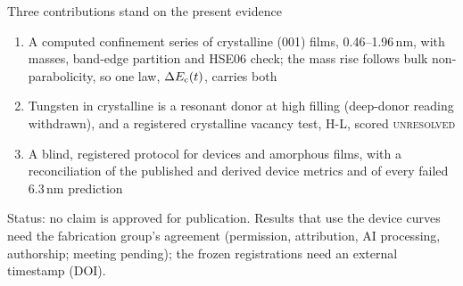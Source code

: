 \begin{frame}{Three contributions stand on the present evidence}
  \fourteenTop
  \begin{enumerate}\small
    \setlength{\itemsep}{2.5mm}
    \item A computed confinement series of crystalline (001) \InO{} films, 0.46--1.96\,nm, with masses, band-edge
      partition and HSE06 check; the mass rise follows bulk non-parabolicity, so one law, $\Delta E_{\mathrm{c}}(t)$, carries both
      \,
    \item Tungsten in crystalline \InO{} is a resonant donor at high filling (deep-donor reading withdrawn), and a
      registered crystalline vacancy test, H-L, scored \textsc{unresolved} 
    \item A blind, registered protocol for devices and amorphous films, with a reconciliation of the published and
      derived device metrics and of every failed 6.3\,nm prediction \,
  \end{enumerate}
  \vspace{3mm}
  {\footnotesize Status: no claim is approved for publication. Results that use the device curves need the fabrication
    group's agreement (permission, attribution, AI processing, authorship; meeting pending); the frozen registrations
    need an external timestamp (DOI).\par}
\end{frame}

